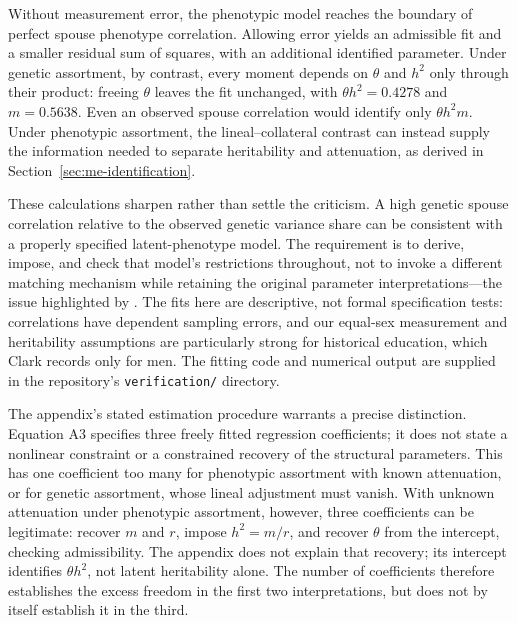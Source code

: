 Without measurement error, the phenotypic model reaches the boundary of
perfect spouse phenotype correlation. Allowing error yields an admissible
fit and a smaller residual sum of squares, with an additional identified
parameter. Under genetic assortment, by contrast, every moment depends on
$\theta$ and $h^2$ only through their product: freeing $\theta$ leaves the
fit unchanged, with $\theta h^2=0.4278$ and $m=0.5638$. Even an observed
spouse correlation would identify only $\theta h^2m$. Under phenotypic
assortment, the lineal--collateral contrast can instead supply the
information needed to separate heritability and attenuation, as derived
in Section~\ref{sec:me-identification}.

These calculations sharpen rather than settle the criticism. A high
genetic spouse correlation relative to the observed genetic variance share
can be consistent with a properly specified latent-phenotype model.
The requirement is to derive, impose, and check that model's restrictions
throughout, not to invoke a different matching mechanism while retaining
the original parameter interpretations---the issue highlighted by
\citet[p.~19]{Goldberger1978}. The fits here are descriptive, not formal
specification tests: correlations have dependent sampling errors, and our
equal-sex measurement and heritability assumptions are particularly strong
for historical education, which Clark records only for men. The fitting
code and numerical output are supplied in the repository's
\texttt{verification/} directory.

The appendix's stated estimation procedure warrants a precise distinction.
Equation A3 specifies three freely fitted regression coefficients; it
does not state a nonlinear constraint or a constrained recovery of the
structural parameters. This has one coefficient too many for phenotypic
assortment with known attenuation, or for genetic assortment, whose lineal
adjustment must vanish. With unknown attenuation under phenotypic
assortment, however, three coefficients can be legitimate: recover $m$
and $r$, impose $h^2=m/r$, and recover $\theta$ from the intercept,
checking admissibility. The appendix does not explain that recovery;
its intercept identifies $\theta h^2$, not latent heritability alone.
The number of coefficients therefore establishes the excess freedom in
the first two interpretations, but does not by itself establish it in
the third.
